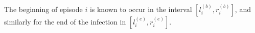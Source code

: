 \documentclass[thesis.tex]{subfiles}
\begin{document}

The beginning of episode $i$ is known to occur in the interval $[l_i^{(b)}, r_i^{(b)}]$, and similarly for the end of the infection in $[l_i^{(e)}, r_i^{(e)}]$.

\ifSubfilesClassLoaded{
  \listoftodos
}{}
\end{document}
